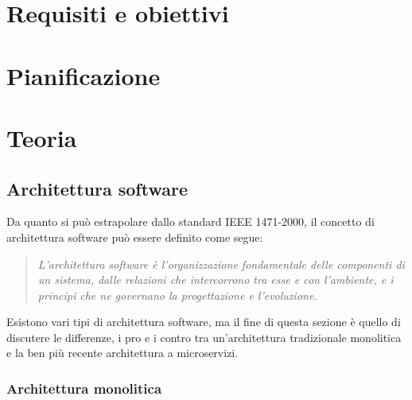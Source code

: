 \section{Requisiti e obiettivi}


\section{Pianificazione}

\section{Teoria}

\subsection{Architettura software}

Da quanto si può estrapolare dallo standard IEEE 1471-2000, il concetto di architettura software può essere definito come segue:
\begin{quotation}
\noindent \textit{L'architettura software è l'organizzazione fondamentale delle componenti di un sistema, dalle relazioni che intercorrono tra esse e con l'ambiente, e i principi che ne governano la progettazione e l'evoluzione.}
\end{quotation} 

Esistono vari tipi di architettura software, ma il fine di questa sezione è quello di discutere le differenze, i pro e i contro tra un'architettura tradizionale monolitica e la ben più recente architettura a microservizi.

\subsubsection{Architettura monolitica}

